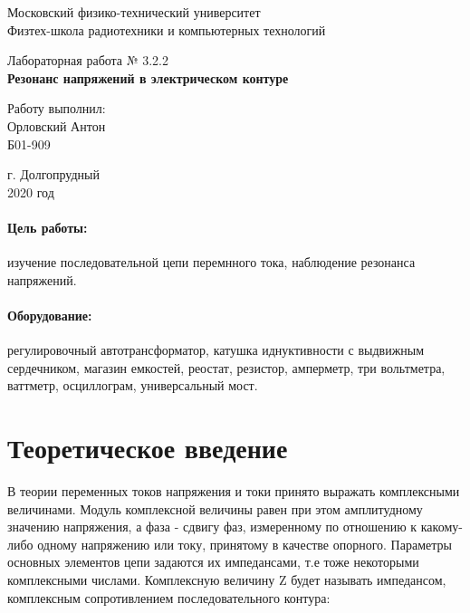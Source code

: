 \documentclass[a4paper,12pt]{article}
\begin{document}
\begin{titlepage}
	\begin{center}
		\large 	Московский физико-технический университет \\
		Физтех-школа радиотехники и компьютерных технологий\\
		\vspace{0.2cm}
		
		\vspace{4.5cm}
		Лабораторная работа № 3.2.2 \\ \vspace{0.2cm}
		\LARGE \textbf{Резонанс напряжений в электрическом контуре}
	\end{center}
	\vspace{2.3cm} \large
	
	\begin{center}
		Работу выполнил: \\
		Орловский Антон \\
		Б01-909

		
	\end{center}
	
	\begin{center} \vspace{60mm}
		г. Долгопрудный \\
		 2020 год
	\end{center}
\end{titlepage}




\paragraph*{Цель работы:} изучение последовательной цепи перемнного тока, наблюдение резонанса напряжений.
\paragraph*{Оборудование:} регулировочный автотрансформатор, катушка иднуктивности с выдвижным сердечником, магазин емкостей, реостат, резистор, амперметр, три вольтметра, ваттметр, осциллограм, универсальный мост.



\section{Теоретическое введение}

В теории переменных токов напряжения и токи принято выражать комплексными величинами. Модуль комплексной величины равен при этом амплитудному значению напряжения, а фаза - сдвигу фаз, измеренному по отношению к какому-либо одному напряжению или току, принятому в качестве опорного. Параметры основных элементов цепи задаются их импедансами, т.е тоже некоторыми комплексными числами.
\newline
Комплексную величину Z будет называть импедансом, комплексным сопротивлением последовательного контура:
\end{document}
